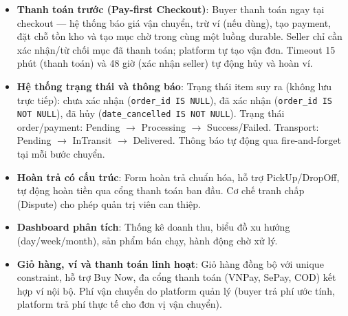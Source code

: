 \begin{itemize}
    \item \textbf{Thanh toán trước (Pay-first Checkout)}: Buyer thanh toán ngay tại checkout --- hệ thống báo giá vận chuyển, trừ ví (nếu dùng), tạo payment, đặt chỗ tồn kho và tạo mục chờ trong cùng một luồng durable. Seller chỉ cần xác nhận/từ chối mục đã thanh toán; platform tự tạo vận đơn. Timeout 15 phút (thanh toán) và 48 giờ (xác nhận seller) tự động hủy và hoàn ví.
    \item \textbf{Hệ thống trạng thái và thông báo}: Trạng thái item suy ra (không lưu trực tiếp): chưa xác nhận (\texttt{order\_id IS NULL}), đã xác nhận (\texttt{order\_id IS NOT NULL}), đã hủy (\texttt{date\_cancelled IS NOT NULL}). Trạng thái order/payment: Pending $\rightarrow$ Processing $\rightarrow$ Success/Failed. Transport: Pending $\rightarrow$ InTransit $\rightarrow$ Delivered. Thông báo tự động qua fire-and-forget tại mỗi bước chuyển.
    \item \textbf{Hoàn trả có cấu trúc}: Form hoàn trả chuẩn hóa, hỗ trợ PickUp/DropOff, tự động hoàn tiền qua cổng thanh toán ban đầu. Cơ chế tranh chấp (Dispute) cho phép quản trị viên can thiệp.
    \item \textbf{Dashboard phân tích}: Thống kê doanh thu, biểu đồ xu hướng (day/week/month), sản phẩm bán chạy, hành động chờ xử lý.
    \item \textbf{Giỏ hàng, ví và thanh toán linh hoạt}: Giỏ hàng đồng bộ với unique constraint, hỗ trợ Buy Now, đa cổng thanh toán (VNPay, SePay, COD) kết hợp ví nội bộ. Phí vận chuyển do platform quản lý (buyer trả phí ước tính, platform trả phí thực tế cho đơn vị vận chuyển).
\end{itemize}
